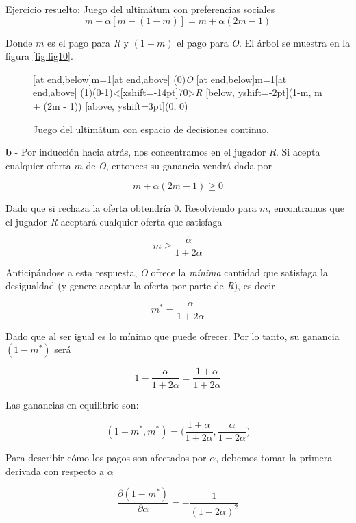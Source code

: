 \documentclass[12pt]{scrartcl}
\begin{document}
\begin{exbox}{Ejercicio resuelto: Juego del ultimátum con preferencias sociales}
	\[ m + \alpha[m - (1-m)] = m + \alpha(2m - 1)\]
	
	Donde $m$ es el pago para \textit{R} y $(1-m)$ el pago para \textit{O}. El árbol se muestra en la figura \ref{fig:fig10}.
	
	\begin{figure}[H]
		\centering
		\begin{istgame}[font=\scriptsize]
			\cntmdistance{20mm}{20mm}
			[at end,below]{m=1}[at end,above]
			\istrootcntmA(0){\textit{O}}
			\istbA[draw=none]
			\endist
			[at end,below]{m=1}[at end,above]
			\istroot(1)(0-1)<[xshift=-14pt]70>{\textit{R}}
			[below, yshift=-2pt]{(1-m, m + \alpha(2m - 1))} [above, yshift=3pt]{(0, 0)}
			\endist
		\end{istgame}
		\caption{Juego del ultimátum con espacio de decisiones continuo.}
		\label{fig:fig8}
	\end{figure}
	
	\textbf{b} - Por inducción hacia atrás, nos concentramos en el jugador \textit{R}. Si acepta cualquier oferta $m$ de \textit{O}, entonces su ganancia vendrá dada por
	
	\[ m + \alpha(2m - 1) \geq 0 \]
	
	Dado que si rechaza la oferta obtendría 0. Resolviendo para $m$, encontramos que el jugador \textit{R} aceptará cualquier oferta que satisfaga
	
	\[ m \geq \frac{\alpha}{1 + 2\alpha} \]
	
	Anticipándose a esta respuesta, \textit{O} ofrece la \textit{mínima} cantidad que satisfaga la desigualdad (y genere aceptar la oferta por parte de \textit{R}), es decir
	
	\[ m^* = \frac{\alpha}{1 + 2\alpha} \]
	
	Dado que al ser igual es lo mínimo que puede ofrecer. Por lo tanto, su ganancia $(1 - m^*)$ será
	
	\[1 - \frac{\alpha}{1 + 2\alpha} = \frac{1 + \alpha}{1 + 2\alpha} \]
	
	Las ganancias en equilibrio son:
	
	\[ (1 - m^*, m^*) = \Bigg( \frac{1 + \alpha}{1 + 2\alpha}, \frac{\alpha}{1 + 2\alpha} \Bigg )\]
	
	Para describir cómo los pagos son afectados por $\alpha$, debemos tomar la primera derivada con respecto a $\alpha$
	
	\[ \frac{\partial (1 - m^*)}{\partial \alpha} = - \frac{1}{(1 + 2\alpha)^2}\]
	

\end{exbox}
\end{document}
